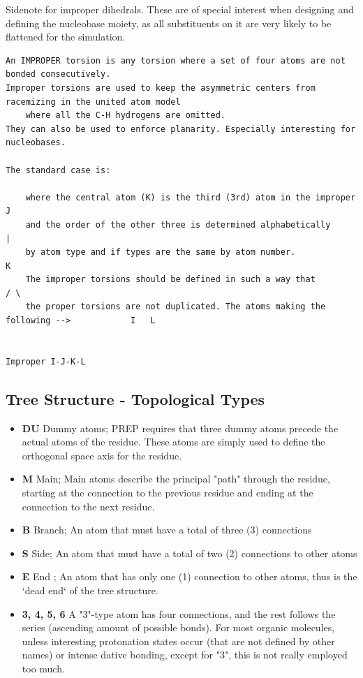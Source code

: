\documentclass[a4paper]{article}
\begin{document}
\vspace{3mm}
\noindent Sidenote for improper dihedrals. These are of special interest when designing and defining the nucleobase moiety, as all substituents on it are very likely to be flattened for the simulation.
\scriptsize
\begin{tcolorbox}
\begin{verbatim}
An IMPROPER torsion is any torsion where a set of four atoms are not bonded consecutively.
Improper torsions are used to keep the asymmetric centers from racemizing in the united atom model
    where all the C-H hydrogens are omitted.
They can also be used to enforce planarity. Especially interesting for nucleobases.

The standard case is:

    where the central atom (K) is the third (3rd) atom in the improper                      J
    and the order of the other three is determined alphabetically                           |
    by atom type and if types are the same by atom number.                                  K
    The improper torsions should be defined in such a way that                             / \
    the proper torsions are not duplicated. The atoms making the following -->            I   L

                                                                                    Improper I-J-K-L
\end{verbatim}
\end{tcolorbox}
\subsection{Tree Structure - Topological Types}\label{sec:ambertree}
\footnotesize
\begin{itemize}
    \item \textbf{DU} Dummy atoms; PREP requires that three dummy atoms precede the actual atoms of the residue. These atoms are simply used to define the orthogonal space axis for the residue.
    \item \textbf{M} Main; Main atoms describe the principal "path" through the residue, starting at the connection to the previous residue and ending at the connection to the next  residue.
    \item \textbf{B} Branch; An atom that must have a total of three (3) connections
    \item \textbf{S} Side; An atom that must have a total of two (2) connections to  other  atoms
    \item \textbf{E} End ; An atom that has only one (1) connection to other atoms,  thus is the `dead end` of the tree structure.
    \item \textbf{3, 4, 5, 6} A "3"-type atom has four connections, and the rest follows the series (ascending amount of possible bonds). For most organic molecules, unless interesting protonation states occur (that are not defined by other names) or intense dative bonding, except for "3", this is not really employed too much.
\end{itemize}
\end{document}
